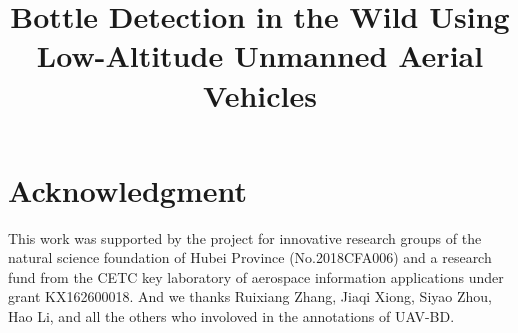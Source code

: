 \documentclass[conference]{IEEEtran}
\begin{document}
\title{Bottle Detection in the Wild Using Low-Altitude Unmanned Aerial Vehicles
}
\author{


}

\maketitle















\section*{Acknowledgment}

This work was supported by the project for innovative research groups of the natural science foundation of Hubei Province (No.2018CFA006) and a research fund from the CETC key laboratory of aerospace information applications under grant KX162600018. And we thanks Ruixiang Zhang, Jiaqi Xiong, Siyao Zhou, Hao Li, and all the others who involoved in the annotations of UAV-BD.
\end{document}

